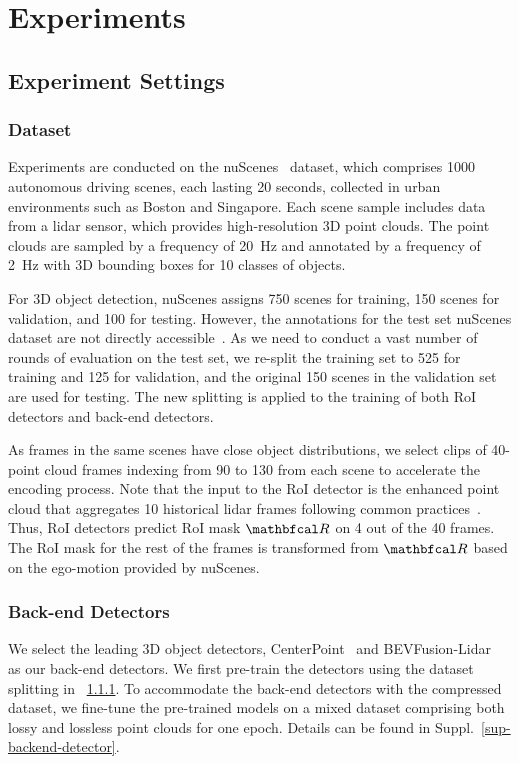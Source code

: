 \section{Experiments}
\subsection{Experiment Settings}

\subsubsection{Dataset}
\label{sec-dataset}
Experiments are conducted on the nuScenes~\cite{caesarnuScenesMultimodalDataset2020} dataset, which comprises 1000 autonomous driving scenes, each lasting 20 seconds, collected in urban environments such as Boston and Singapore. Each scene sample includes data from a lidar sensor, which provides high-resolution 3D point clouds. The point clouds are sampled by a frequency of 20~Hz and annotated by a frequency of 2~Hz with 3D bounding boxes for 10 classes of objects. 

For 3D object detection, nuScenes assigns 750 scenes for training, 150 scenes for validation, and 100 for testing. However, the annotations for the test set nuScenes dataset are not directly accessible~\cite{nusceneswebsite}. As we need to conduct a vast number of rounds of evaluation on the test set, we re-split the training set to 525 for training and 125 for validation, and the original 150 scenes in the validation set are used for testing. The new splitting is applied to the training of both RoI detectors and back-end detectors. 

As frames in the same scenes have close object distributions, we select clips of 40-point cloud frames indexing from 90 to 130 from each scene to accelerate the encoding process. Note that the input to the RoI detector is the enhanced point cloud that aggregates 10 historical lidar frames following common practices~\cite{mmdet3d2020}. Thus, RoI detectors predict RoI mask $\roimaskpc$ on 4 out of the 40 frames. The RoI mask for the rest of the frames is transformed from $\roimaskpc$ based on the ego-motion provided by nuScenes.

\subsubsection{Back-end Detectors}
\label{back-end-detectors}
We select the leading 3D object detectors, CenterPoint~\cite{yin2021center} and BEVFusion-Lidar~\cite{liu2023bevfusion} as our back-end detectors. We first pre-train the detectors using the dataset splitting in ~\cref{sec-dataset}. To accommodate the back-end detectors with the compressed dataset, we fine-tune the pre-trained models on a mixed dataset comprising both lossy and lossless point clouds for one epoch. Details can be found in Suppl.~\ref{sup-backend-detector}.

